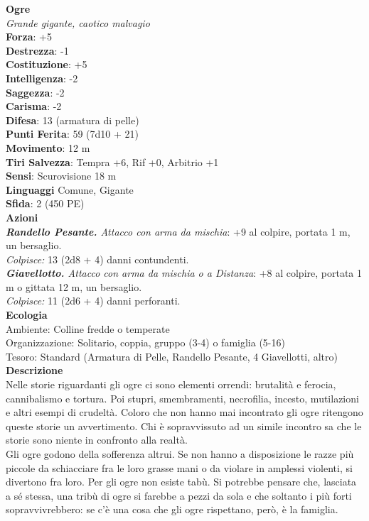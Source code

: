 \begin{multicols}{2}
\medskip\textbf{Ogre}\\
\emph{Grande gigante, caotico malvagio}\\
\textbf{Forza}: +5\\
\textbf{Destrezza}: -1\\
\textbf{Costituzione}: +5\\
\textbf{Intelligenza}: -2\\
\textbf{Saggezza}: -2\\
\textbf{Carisma}: -2\\
\textbf{Difesa}: 13 (armatura di pelle)\\
\textbf{Punti Ferita}: 59 (7d10 + 21)\\
\textbf{Movimento}: 12 m\\
\textbf{Tiri Salvezza}: Tempra +6, Rif +0, Arbitrio +1\\
\textbf{Sensi}: Scurovisione 18 m\\
\textbf{Linguaggi} Comune, Gigante\\
\textbf{Sfida}: 2 (450 PE)\smallskip\\
\smallskip\textbf{Azioni}\\
\emph{\textbf{Randello Pesante.} Attacco con arma da mischia}: +9 al colpire, portata 1 m, un bersaglio.\\
\emph{Colpisce:} 13 (2d8 + 4) danni contundenti.\\
\emph{\textbf{Giavellotto.} Attacco con arma da mischia o a Distanza}: +8 al colpire, portata 1 m o gittata 12 m, un bersaglio.\\
\emph{Colpisce:} 11 (2d6 + 4) danni perforanti.\\
\textbf{Ecologia}\\
Ambiente: Colline fredde o temperate\\
Organizzazione: Solitario, coppia, gruppo (3-4) o famiglia (5-16)\\
Tesoro: Standard (Armatura di Pelle, Randello Pesante, 4 Giavellotti, altro)\\
\textbf{Descrizione}\\
Nelle storie riguardanti gli ogre ci sono elementi orrendi: brutalità e ferocia, cannibalismo e tortura. Poi stupri, smembramenti, necrofilia, incesto, mutilazioni e altri esempi di crudeltà. Coloro che non hanno mai incontrato gli ogre ritengono queste storie un avvertimento. Chi è sopravvissuto ad un simile incontro sa che le storie sono niente in confronto alla realtà.\\

Gli ogre godono della sofferenza altrui. Se non hanno a disposizione le razze più piccole da schiacciare fra le loro grasse mani o da violare in amplessi violenti, si divertono fra loro. Per gli ogre non esiste tabù. Si potrebbe pensare che, lasciata a sé stessa, una tribù di ogre si farebbe a pezzi da sola e che soltanto i più forti sopravvivrebbero: se c’è una cosa che gli ogre rispettano, però, è la famiglia.\\


\end{multicols}
